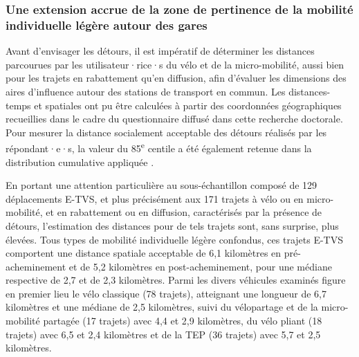 \begin{refsegment}
\subsubsection*{Une extension accrue de la zone de pertinence de la mobilité individuelle légère autour des gares
    \label{chap5:extension-accrue-quartier-gare}
    }

Avant d'envisager les détours, il est impératif de déterminer les distances parcourues par les utilisateur·rice·s du vélo et de la micro-mobilité, aussi bien pour les trajets en rabattement qu'en diffusion, afin d'évaluer les dimensions des aires d'influence autour des stations de transport en commun. Les distances-temps et spatiales ont pu être calculées à partir des coordonnées géographiques recueillies dans le cadre du questionnaire diffusé dans cette recherche doctorale. Pour mesurer la distance socialement acceptable des détours réalisés par les répondant·e·s, la valeur du 85\textsuperscript{e} centile a été également retenue dans la distribution cumulative appliquée \textcolor{blue}{\autocite[982]{lee_bicycle-based_2016}}.%

En portant une attention particulière au sous-échantillon composé de 129 déplacements \acrshort{E-TVS}, et plus précisément aux 171 trajets à vélo ou en micro-mobilité, et en rabattement ou en diffusion, caractérisés par la présence de détours, l'estimation des distances pour de tels trajets sont, sans surprise, plus élevées. Tous types de mobilité individuelle légère confondus, ces trajets \acrshort{E-TVS} comportent une distance spatiale acceptable de 6,1 kilomètres en pré-acheminement et de 5,2 kilomètres en post-acheminement, pour une médiane respective de 2,7 et de 2,3 kilomètres. Parmi les divers véhicules examinés figure en premier lieu le vélo classique (78 trajets), atteignant une longueur de 6,7 kilomètres et une médiane de 2,5 kilomètres, suivi du vélopartage et de la micro-mobilité partagée (17 trajets) avec 4,4 et 2,9 kilomètres, du vélo pliant (18 trajets) avec 6,5 et 2,4 kilomètres et de la \acrshort{TEP} (36 trajets) avec 5,7 et 2,5 kilomètres.%


\end{refsegment}
